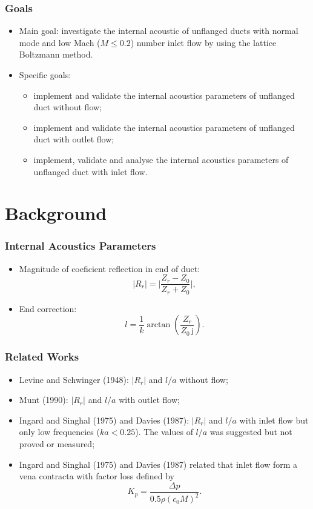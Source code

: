 \documentclass[dvipsnames,12pt]{beamer}
\begin{document}
\begin{frame}
\frametitle{Goals}
\begin{itemize}
    \item Main goal: investigate the internal acoustic of unflanged ducts with normal mode and low Mach ($M \leq 0.2$) number inlet flow by using the lattice Boltzmann method. 
    \item Specific goals:
    \begin{itemize}
      \item implement and validate the internal acoustics parameters of unflanged duct without flow;
      \item implement and validate the internal acoustics parameters of unflanged duct with outlet flow;
      \item implement, validate and analyse the internal acoustics parameters of unflanged duct with inlet flow.
    \end{itemize}
\end{itemize}
\end{frame}


\section{Background}
\begin{frame}
\frametitle{Internal Acoustics Parameters}
\begin{itemize}
    \item Magnitude of coeficient reflection in end of duct:
     \begin{equation}
        |R_{r}| =\bigg|\frac{Z_{r} - Z_{0}}{Z_{r} + Z_{0}}\bigg|,
        \label{eq:R}
    \end{equation}
    \item End correction:
    \begin{equation}
        l = \frac{1}{k} \arctan\!\left(\frac{Z_{r}}{Z_{0} \, \mathrm{j}}\right).
        \label{eq:l}
    \end{equation}
\end{itemize}
\end{frame}

\begin{frame}
\frametitle{Related Works}
\begin{itemize}
    \item Levine and Schwinger (1948): $|R_{r}|$ and $l/a$ without flow;
    \item Munt (1990): $|R_{r}|$ and $l/a$ with outlet flow;
    \item Ingard and Singhal (1975) and Davies (1987): $|R_{r}|$ and $l/a$ with inlet flow but only low frequencies ($ka < 0.25 $). The values of $l/a$ was suggested but not proved or measured;
    \item Ingard and Singhal (1975) and Davies (1987) related that inlet flow form a vena contracta with factor loss defined by
    \begin{equation}
      K_{p} = \frac{\Delta p}{0.5\rho (c_{0}M)^{2}}.
    \end{equation} 
\end{itemize}
\end{frame}
\end{document}
